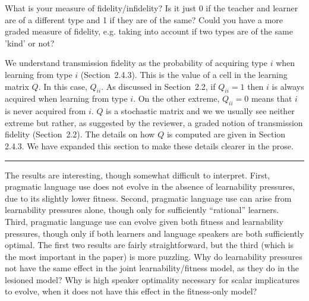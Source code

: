 \documentclass[12pt,a4paper]{article}
\begin{document}
\begin{mdframed}[backgroundcolor=gray!25,linecolor=gray!25,frametitle= Reviewer \thereviewerCounter~comment \thereviewerCommentCounter \hfill ~~({\it transmission fidelity})]
%
What is your measure of fidelity/infidelity? Is it just 0 if the teacher and learner are of a different type and 1 if they are of the same? Could you have a more graded measure of fidelity, e.g. taking into account if two types are of the same 'kind' or not? 
\end{mdframed}
%
We understand transmission fidelity as the probability of acquiring type $i$ when learning from type $i$ (Section~2.4.3). This is the value of a cell in the learning matrix $Q$. In this case, $Q_{ii}$. As discussed in Section~2.2, if $Q_{ii} = 1$ then $i$ is always acquired when learning from type $i$. On the other extreme, $Q_{ii} = 0$ means that $i$ is never acquired from $i$. $Q$ is a stochastic matrix and we we usually see neither extreme but rather, as suggested by the reviewer, a graded notion of transmission fidelity (Section~2.2). The details on how $Q$ is computed are given in Section 2.4.3. We have expanded this section to make these details clearer in the prose.
%

\vspace{0.5cm}




\noindent\rule{\textwidth}{1pt}

\begin{mdframed}[backgroundcolor=gray!25,linecolor=gray!25,frametitle= Reviewer \thereviewerCounter~comment \thereviewerCommentCounter \hfill ~~({\it Interpretation of results})]
%
The results are interesting, though somewhat difficult to interpret. First, pragmatic language use does not evolve in the absence of learnability pressures, due to its slightly lower fitness. Second, pragmatic language use can arise from learnability pressures alone, though only for sufficiently ``rational'' learners. Third, pragmatic language use can evolve given both fitness and learnability pressures, though only if both learners and language speakers are both sufficiently optimal. The first two results are fairly straightforward, but the third (which is the most important in the paper) is more puzzling. Why do learnability pressures not have the same effect in the joint learnability/fitness model, as they do in the lesioned model? Why is high speaker optimality necessary for scalar implicatures to evolve, when it does not have this effect in the fitness-only model?
\end{mdframed}
\end{document}

